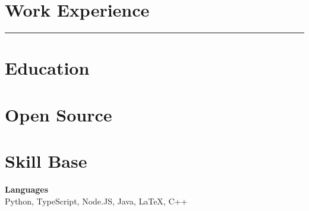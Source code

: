 \documentclass{article}
\newcommand{\ruleLine}{
   	\begin{center}
  	\color{lines}
 	\rule{0.5\textwidth}{.4pt}
	\end{center}
}
\begin{document}
\begin{minipage}[t]{0.55\textwidth}

\raggedright

  \section{Work Experience}
  
  	

  	\ruleLine

  	
  	
\end{minipage}
\hfill
\begin{minipage}[t]{0.43\textwidth}

\raggedright

	\section{Education}

  	
  	
  	\vspace{8pt}

   	

\vspace{10pt}

	\section{Open Source}

	

  	\vspace{8pt}

	

  	\vspace{8pt}

  	

\vspace{10pt}

	\section{Skill Base}
  	\textbf{Languages} \\
  	{\small
  		{\color{highlight}
			Python, TypeScript, Node.JS,
      }
		Java, LaTeX, C++
 	}


\end{minipage}
\end{document}
